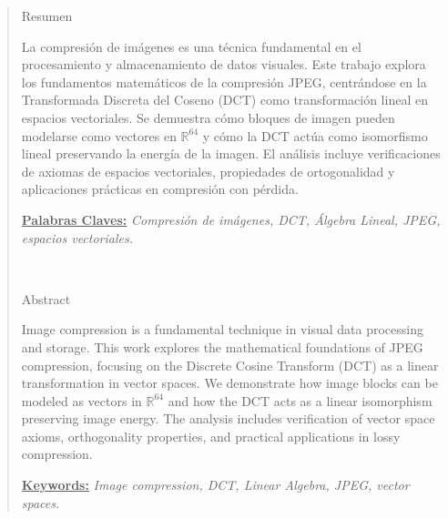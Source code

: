 \documentclass[8pt,a4paper]{article}
\theoremstyle{definition}
\theoremstyle{remark}
\begin{document}
	\begin{quotation}
    {\small
        \begin{center}
            Resumen	
        \end{center}
        \vspace{0.3cm}
            La compresión de imágenes es una técnica fundamental en el procesamiento y almacenamiento de datos visuales. Este trabajo explora los fundamentos matemáticos de la compresión JPEG, centrándose en la Transformada Discreta del Coseno (DCT) como transformación lineal en espacios vectoriales. Se demuestra cómo bloques de imagen pueden modelarse como vectores en $\mathbb{R}^{64}$ y cómo la DCT actúa como isomorfismo lineal preservando la energía de la imagen. El análisis incluye verificaciones de axiomas de espacios vectoriales, propiedades de ortogonalidad y aplicaciones prácticas en compresión con pérdida.

        \vspace{2mm}

        \underline{\textbf{Palabras Claves:}}  \hspace{1mm} \textit{Compresión de imágenes, DCT, Álgebra Lineal, JPEG, espacios vectoriales.}
    }\\
    {\small
        \hspace*{0.5cm}
        \begin{center}
            Abstract
        \end{center}

            Image compression is a fundamental technique in visual data processing and storage. This work explores the mathematical foundations of JPEG compression, focusing on the Discrete Cosine Transform (DCT) as a linear transformation in vector spaces. We demonstrate how image blocks can be modeled as vectors in $\mathbb{R}^{64}$ and how the DCT acts as a linear isomorphism preserving image energy. The analysis includes verification of vector space axioms, orthogonality properties, and practical applications in lossy compression.

        \vspace{2mm}

        \underline{\textbf{Keywords:}}  \hspace{1mm} \textit{Image compression, DCT, Linear Algebra, JPEG, vector spaces.}
    }
    \end{quotation}
\end{document}

